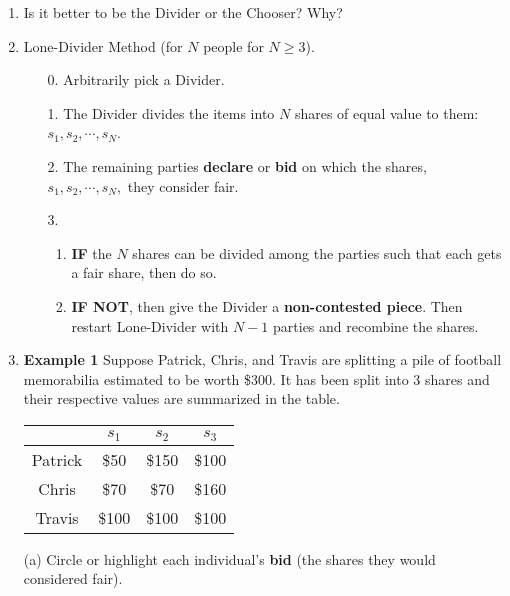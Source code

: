 \documentclass[12pt]{article}
\begin{document}
\begin{enumerate}
\begin{enumerate}
	\end{enumerate}
\vfill
\item Is it better to be the Divider or the Chooser? Why?
\vspace{0.5in}
\newpage
\item Lone-Divider Method (for $N$ people for $N \geq 3$).
	\begin{enumerate}
	\item[0.] Arbitrarily pick a Divider.
	\item[1.] The Divider divides the items into $N$ shares of equal value to them: $s_1,s_2, \cdots, s_N$.
	\item[2.] The remaining parties \textbf{declare} or \textbf{bid} on which the shares, $s_1,s_2, \cdots, s_N,$ they consider fair. 
	\item[3.] 
		\begin{enumerate}
		\item \textbf{IF} the $N$ shares can be divided among the parties such that each gets a fair share, then do so. \\
		\item \textbf{IF NOT}, then give the Divider a \textbf{non-contested piece}. Then restart Lone-Divider with $N-1$ parties and recombine the shares.
		\end{enumerate}
	\end{enumerate}
\item \textbf{Example 1} Suppose Patrick, Chris, and Travis are splitting a pile of football memorabilia estimated to be worth \$300. It has been split into 3 shares and their respective values are summarized in the table.
\begin{multicols}{2}
\begin{tabular}{c||c|c|c}
&$s_1$&$s_2$&$s_3$\\
\hline \hline
Patrick&\$50&\$150&\$100\\
Chris&\$70&\$70&\$160\\
Travis&\$100&\$100&\$100\\
\end{tabular} 

(a) Circle or highlight each individual's \textbf{bid} (the shares they would considered fair).\\


\end{multicols}
\end{enumerate}
\end{document}
